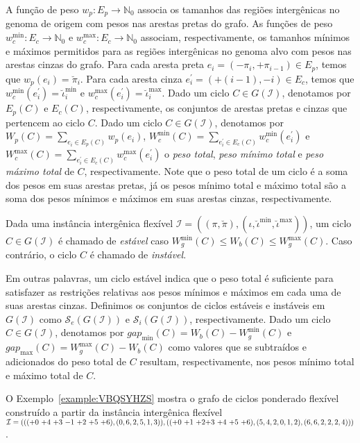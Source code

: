 A função de peso $w_p : E_p \rightarrow \mathbb{N}_0$ associa os tamanhos das regiões intergênicas no genoma de origem com pesos nas arestas pretas do grafo. As funções de peso $w^{\min}_c : E_c \rightarrow \mathbb{N}_0$ e $w^{\max}_c : E_c \rightarrow \mathbb{N}_0$ associam, respectivamente, os tamanhos mínimos e máximos permitidos para as regiões intergênicas no genoma alvo com pesos nas arestas cinzas do grafo. Para cada aresta preta $e_i = (-\pi_i, +\pi_{i-1}) \in E_p$, temos que $w_p(e_i) = \breve\pi_i$. Para cada aresta cinza $e^{\prime}_i = (+(i-1), -i) \in E_c$, temos que $w^{\min}_c(e^{\prime}_i) = \breve\iota^{\min}_i$ e $w^{\max}_c(e^{\prime}_i) = \breve\iota^{\max}_i$. Dado um ciclo $C \in G(\mathcal{I})$, denotamos por $E_p(C)$ e $E_c(C)$, respectivamente, os conjuntos de arestas pretas e cinzas que pertencem ao ciclo $C$. Dado um ciclo $C \in G(\mathcal{I})$, denotamos por $W_p(C)=\sum_{e_i \in E_p(C)} w_p(e_i)$, $W^{\min}_c(C)=\sum_{e^{\prime}_i \in E_c(C)} w^{\min}_c(e^{\prime}_i)$ e $W^{\max}_c(C)=\sum_{e^{\prime}_i \in E_c(C)} w^{\max}_c(e^{\prime}_i)$ o \emph{peso total}, \emph{peso mínimo total} e \emph{peso máximo total} de $C$, respectivamente. Note que o peso total de um ciclo é a soma dos pesos em suas arestas pretas, já os pesos mínimo total e máximo total são a soma dos pesos mínimos e máximos em suas arestas cinzas, respectivamente.

\begin{definition}
Dada uma instância intergênica flexível $\mathcal{I} = ((\pi,\breve\pi),(\iota,\breve\iota^{\min},\breve\iota^{\max}))$, um ciclo $C \in G(\mathcal{I})$ é chamado de \emph{estável} caso $W^{\min}_g(C) \le W_b(C) \le W^{\max}_g(C)$. Caso contrário, o ciclo $C$ é chamado de \emph{instável}.
\end{definition}

Em outras palavras, um ciclo estável indica que o peso total é suficiente para satisfazer as restrições relativas aos pesos mínimos e máximos em cada uma de suas arestas cinzas. Definimos os conjuntos de ciclos estáveis e instáveis em $G(\mathcal{I})$ como $\mathcal{S}_e(G(\mathcal{I}))$ e $\mathcal{S}_i(G(\mathcal{I}))$, respectivamente. Dado um ciclo $C \in G(\mathcal{I})$, denotamos por $gap_{\min}(C) = W_b(C) - W^{\min}_g(C)$ e $gap_{\max}(C) = W^{\max}_g(C) - W_b(C)$ como valores que se subtraídos e adicionados do peso total de $C$ resultam, respectivamente, nos pesos mínimo total e máximo total de $C$.

O Exemplo~\ref{example:VBQSYHZS} mostra o grafo de ciclos ponderado flexível construído a partir da instância intergênica flexível $\mathcal{I} = ((({+0}~{+4}~{+3}~{-1}~{+2}~{+5}~{+6}),(0,6,2,5,1,3)),(({+0}~{+1}~{+2}\break{+3}~{+4}~{+5}~{+6}),(5,4,2,0,1,2),(6,6,2,2,2,4)))$.

